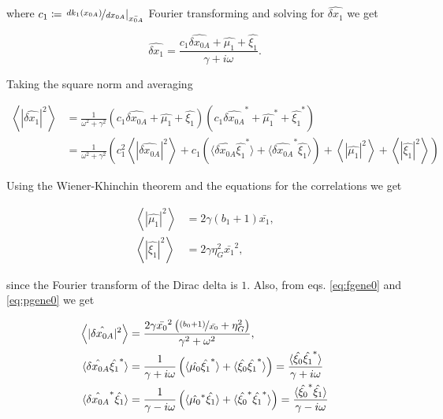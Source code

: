 where $c_1 \coloneqq \left.\nicefrac{dk_1(x_{0A})}{dx_{0A}}\right|_{\bar{x_{0A}}}$ Fourier transforming and solving for $\hat{\delta x_1}$ we get

\begin{equation*}
  \hat{\delta x_1}=\frac{c_1\hat{\delta x_{0A}}+\hat{\mu_1}+\hat{\xi_1}}{\gamma + i\omega}.
\end{equation*}

Taking the square norm and averaging

\begin{equation*}
  \label{eq:pgene1}
  \begin{split}
    \left\langle|\hat{\delta x_1}|^2\right\rangle &= \frac{1}{\omega^2+\gamma^2}\left(c_1\hat{\delta x_{0A}} + \hat{\mu_1} + \hat{\xi_1}\right)\left(c_1\hat{\delta x_{0A}}^* + \hat{\mu_1}^* + \hat{\xi_1}^*\right)\\
    &=\frac{1}{\omega^2+\gamma^2}\left(c_1^2 \left\langle|\hat{\delta x_{0A}}|^2\right\rangle + c_1\left(\langle\hat{\delta x_{0A}}\hat{\xi_1}^*\rangle+\langle\hat{\delta x_{0A}}^*\hat{\xi_1}\rangle\right) +  \left\langle|\hat{\mu_1}|^2\right\rangle +  \left\langle|\hat{\xi_1}|^2\right\rangle\right)
  \end{split}
\end{equation*}

Using the Wiener-Khinchin theorem and the equations for the correlations we get

\begin{align*}
  \left\langle|\hat{\mu_1}|^2\right\rangle &= 2\gamma(b_1+1)\bar{x_1},\\
  \left\langle|\hat{\xi_1}|^2\right\rangle &= 2\gamma\eta_G^2\bar{x_1}^2,
\end{align*}

since the Fourier transform of the Dirac delta is $1$. Also, from eqs. \eqref{eq:fgene0} and \eqref{eq:pgene0} we get

\begin{align*}
\left\langle|\hat{\delta x_{0A}}|^2\right\rangle &= \frac{2\gamma\bar{x_0}^2\left(\nicefrac{(b_0+1)}{\bar{x_0}}+ \eta_G^2\right)}{\gamma^2+\omega^2},\\
\langle\hat{\delta x_{0A}}\hat{\xi_1}^*\rangle &= \frac{1}{\gamma+i\omega}\left(\langle\hat{\mu_0}\hat{\xi_1}^*\rangle + \langle\hat{\xi_0}\hat{\xi_1}^*\rangle \right) = \frac{\langle\hat{\xi_0}\hat{\xi_1}^*\rangle}{\gamma+i\omega}\\
\langle\hat{\delta x_{0A}}^*\hat{\xi_1}\rangle &= \frac{1}{\gamma-i\omega}\left(\langle\hat{\mu_0}^*\hat{\xi_1}\rangle + \langle\hat{\xi_0}^*\hat{\xi_1}^*\rangle \right) = \frac{\langle\hat{\xi_0}^*\hat{\xi_1}\rangle}{\gamma-i\omega}
\end{align*}

